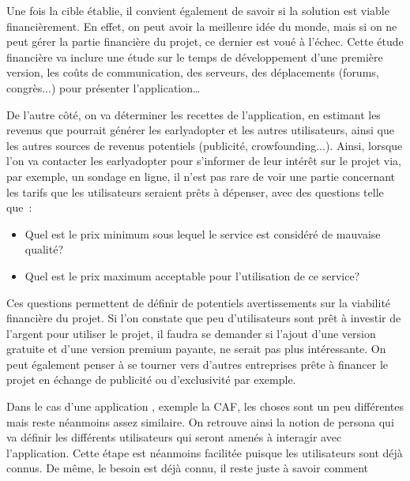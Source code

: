Une fois la cible établie, il convient également de savoir si la solution est viable financièrement. En effet, on peut avoir la meilleure idée du monde, mais si on ne peut gérer la partie financière du projet, ce dernier est voué à l'échec. Cette étude financière va inclure une étude sur le temps de développement d'une première version, les coûts de communication, des serveurs, des déplacements (forums, congrès...) pour présenter l'application\ldots

De l'autre côté, on va déterminer les recettes de l'application, en estimant les revenus que pourrait générer les \gls{earlyadopter} et les autres utilisateurs, ainsi que les autres sources de revenus potentiels (publicité, crowfounding...). Ainsi, lorsque l'on va contacter les \gls{earlyadopter} pour s'informer de leur intérêt sur le projet via, par exemple, un sondage en ligne, il n'est pas rare de voir une partie concernant les tarifs que les utilisateurs seraient prêts à dépenser, avec des questions telle que :

\begin{itemize}
	\setlength\itemsep{-0.5em}
	\item Quel est le prix minimum sous lequel le service est considéré de mauvaise qualité?
	\item Quel est le prix maximum acceptable pour l'utilisation de ce service?
\end{itemize}

Ces questions permettent de définir de potentiels avertissements sur la viabilité financière du projet. Si l'on constate que peu d'utilisateurs sont prêt à investir de l'argent pour utiliser le projet, il faudra se demander si l'ajout d'une version gratuite et d'une version premium payante, ne serait pas plus intéressante. On peut également penser à se tourner vers d'autres entreprises prête à financer le projet en échange de publicité ou d'exclusivité par exemple.

Dans le cas d'une application , exemple la \gls{CAF}, les choses sont un peu différentes mais reste néanmoins assez similaire. On retrouve ainsi la notion de \gls{persona} qui va définir les différents utilisateurs qui seront amenés à interagir avec l'application. Cette étape est néanmoins facilitée puisque les utilisateurs sont déjà connus. De même, le besoin est déjà connu, il reste juste à savoir comment 


